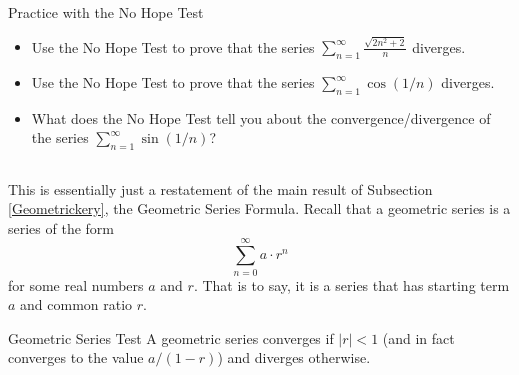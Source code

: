 \begin{exercise}{Practice with the No Hope Test \Coffeecup \Coffeecup}
\begin{itemize}
\item Use the No Hope Test to prove that the series $ \sum_{n=1}^\infty \frac{\sqrt{2n^2+2}}{n}$ diverges.
\item Use the No Hope Test to prove that the series $ \sum_{n=1}^\infty \cos(1/n)$ diverges.
\item What does the No Hope Test tell you about the convergence/divergence of the series $ \sum_{n=1}^\infty \sin(1/n)$?  
\end{itemize}
\end{exercise}

\subsection{}
This is essentially just a restatement of the main result of Subsection \ref{Geometrickery}, the Geometric Series Formula.  Recall that a geometric series is a series of the form $$ \sum_{n=0}^\infty a\cdot r^n$$ for some real numbers $a$ and $r$.  That is to say, it is a series that has starting term $a$ and common ratio $r$.
\begin{theorem}{Geometric Series Test}
A geometric series converges if $|r|<1$ (and in fact converges to the value $a/(1-r)$) and diverges otherwise.
\end{theorem}

